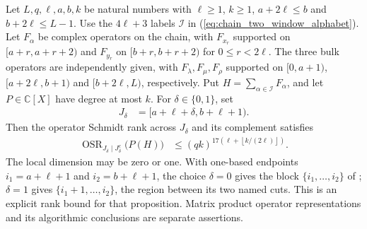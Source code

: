 \begin{lemma}
    \label{thm:chain_two_window_polynomial_rank}
    \leanok
    Let $L,q,\ell,a,b,k$ be natural numbers with $\ell\ge1$, $k\ge1$,
    $a+2\ell\le b$ and $b+2\ell\le L-1$.
    Use the $4\ell+3$ labels $\mathcal I$ in
    (\ref{eq:chain_two_window_alphabet}).
    Let $F_\alpha$ be complex operators on the chain, with $F_{x_r}$
    supported on $[a+r,a+r+2)$ and
    $F_{y_r}$ on $[b+r,b+r+2)$ for
    $0\le r<2\ell$. The three bulk operators are independently given,
    with $F_\lambda,F_\mu,F_\rho$ supported on $[0,a+1)$,
    $[a+2\ell,b+1)$ and
    $[b+2\ell,L)$, respectively.
    Put $H=\sum_{\alpha\in\mathcal I}F_\alpha$, and let
    $P\in\mathbb C[X]$ have degree at most $k$.
    For $\delta\in\{0,1\}$, set
    \begin{align}
        J_\delta & =[a+\ell+\delta,b+\ell+1).
        \label{eq:chain_two_window_polynomial_target}
    \end{align}
    Then the operator Schmidt rank across $J_\delta$ and its complement
    satisfies
    \begin{align}
        \operatorname{OSR}_{J_\delta\mid J_\delta^c}\bigl(P(H)\bigr)
         & \le(qk)^{17\left(\ell+\left\lfloor k/(2\ell)\right\rfloor\right)}.
        \label{eq:chain_two_window_polynomial_rank}
    \end{align}
    The local dimension may be zero or one. With one-based endpoints
    $i_1=a+\ell+1$ and $i_2=b+\ell+1$, the choice $\delta=0$ gives the
    block $\{i_1,\ldots,i_2\}$ of
    \cite[Proposition~5.7]{Arad2016RigorousRG}; $\delta=1$ gives
    $\{i_1+1,\ldots,i_2\}$, the region between its two named cuts.
    This is an explicit rank bound for that proposition.
    Matrix product operator representations and its algorithmic conclusions
    are separate assertions.
\end{lemma}
